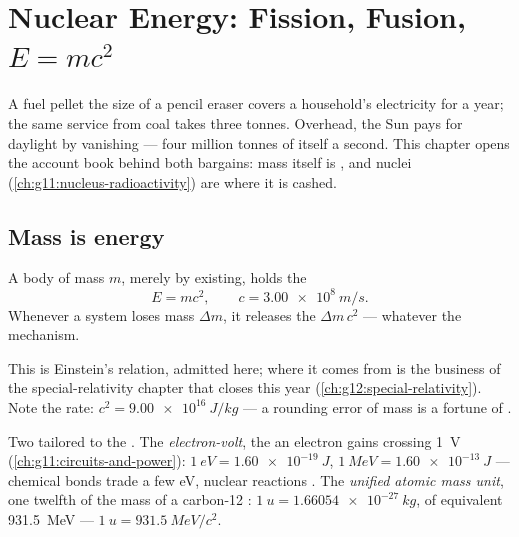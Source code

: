 \chapter{Nuclear Energy: Fission, Fusion, $E=mc^2$}\label{ch:g12:nuclear-energy}

A fuel pellet the size of a pencil eraser covers a household's electricity
for a year; the same service from coal takes three tonnes. Overhead, the Sun
pays for daylight by vanishing --- four million tonnes of itself a second.
This chapter opens the account book behind both bargains: mass itself is
, and nuclei (\cref{ch:g11:nucleus-radioactivity}) are where it is cashed.

\section{Mass is energy}

\begin{theorem}\label{thm:g12:nuclear-energy:emc2}
A body of mass $m$, merely by existing, holds the 
\[
E = m c^2, \qquad c = \qty{3.00e8}{m/s}.
\]
Whenever a system loses mass $\Delta m$, it releases the 
$\Delta m\, c^2$ --- whatever the mechanism.
\end{theorem}
\admitted

\begin{remark}[Einstein, 1905]\label{rem:g12:nuclear-energy:einstein}
This is Einstein's relation, admitted here; where it comes from is the business
of the special-relativity chapter that closes this year
(\cref{ch:g12:special-relativity}). Note the rate: $c^2 = \qty{9.00e16}{J/kg}$
--- a rounding error of mass is a fortune of .
\end{remark}

\begin{definition}\label{def:g12:nuclear-energy:units}
Two  tailored to the . The
\emph{electron-volt}, the  an electron gains
crossing \qty{1}{V} (\cref{ch:g11:circuits-and-power}):
$\qty{1}{eV} = \qty{1.60e-19}{J}$, $\qty{1}{MeV} = \qty{1.60e-13}{J}$ ---
chemical bonds trade a few \unit{eV}, nuclear reactions .
The \emph{unified atomic mass unit}, one
twelfth of the mass of a carbon-12 : $\qty{1}{u} = \qty{1.66054e-27}{kg}$,
of  equivalent \qty{931.5}{MeV} --- $\qty{1}{u} = \qty{931.5}{MeV}/c^2$.
\end{definition}

